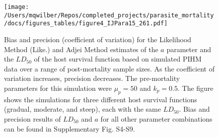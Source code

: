 \documentclass[12pt, a4paper]{article}
\begin{document}

\begin{figure}
\texttt{[image: /Users/mqwilber/Repos/completed\_projects/parasite\_mortality/docs/figures\_tables/figure4\_IJPara15\_261.pdf]}
\caption{Bias and precision (coefficient of variation) for the Likelihood Method (Like.) and Adjei Method estimates of the $a$ parameter and the $LD_{50}$ of the host survival function based on simulated PIHM data over a range of post-mortality sample sizes.  As the coefficient of variation increases, precision decreases. The pre-mortality parameters for this simulation were $\mu_p = 50$ and $k_p = 0.5$.  The figure shows the simulations for three different host survival functions (gradual, moderate, and steep), each with the same $LD_{50}$.  Bias and precision results of $LD_{50}$ and $a$ for all other parameter combinations can be found in Supplementary Fig. S4-S9.}
\end{figure}







\end{document}

